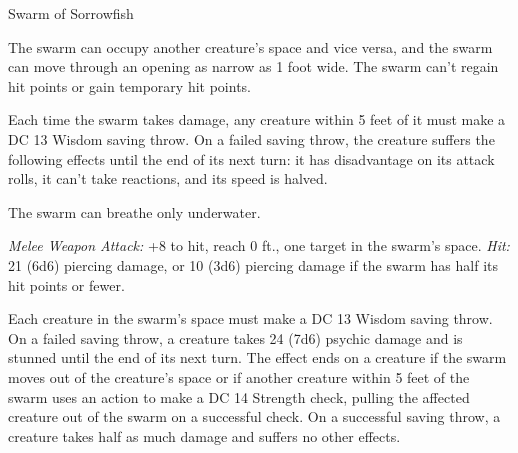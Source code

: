 \documentclass[10pt,a4paper,twoside,bg=none,twocolumn,openany,nodeprecatedcode]{dndbook}
\begin{document}
\begin{DndMonster}[float=t]{Swarm of Sorrowfish}
\DndMonsterBasics[
armor-class = {14},
hit-points = {\DndDice{16d8 + 32}},
speed = {0 ft., swim 30 ft.}
]
\DndMonsterAbilityScores[
 str = 16,
 dex = 19,
 con = 14,
 int = 1,
 wis = 11,
 cha = 3
]
\DndMonsterDetails[
damage-resistances = {bludgeoning, piercing, slashing},
damage-immunities = {psychic},
senses = {blindsight 60 ft. (blind beyond this radius), passive perception 10},
challenge = 6,
]
The swarm can occupy another creature's space and vice versa, and the swarm can move through an opening as narrow as 1 foot wide. The swarm can't regain hit points or gain temporary hit points.

Each time the swarm takes damage, any creature within 5 feet of it must make a DC 13 Wisdom saving throw. On a failed saving throw, the creature suffers the following effects until the end of its next turn: it has disadvantage on its attack rolls, it can't take reactions, and its speed is halved.

The swarm can breathe only underwater.

\par
{}
\textsl{Melee Weapon Attack:} +8 to hit, reach 0 ft., one target in the swarm's space. \textsl{Hit:} 21 (6d6) piercing damage, or 10 (3d6) piercing damage if the swarm has half its hit points or fewer.

Each creature in the swarm's space must make a DC 13 Wisdom saving throw. On a failed saving throw, a creature takes 24 (7d6) psychic damage and is stunned until the end of its next turn. The effect ends on a creature if the swarm moves out of the creature's space or if another creature within 5 feet of the swarm uses an action to make a DC 14 Strength check, pulling the affected creature out of the swarm on a successful check. On a successful saving throw, a creature takes half as much damage and suffers no other effects.

\end{DndMonster}
\end{document}
